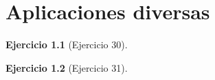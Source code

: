 \documentclass[a4paper,11pt]{book}
\newtheorem{ejer}{Ejercicio}[section]
\begin{document}
  

\chapter{Aplicaciones diversas} 

  

\begin{ejer}[Ejercicio 30] 

  

\end{ejer} 

  

\begin{ejer}[Ejercicio 31] 

  

\end{ejer} 

  
\end{document}
